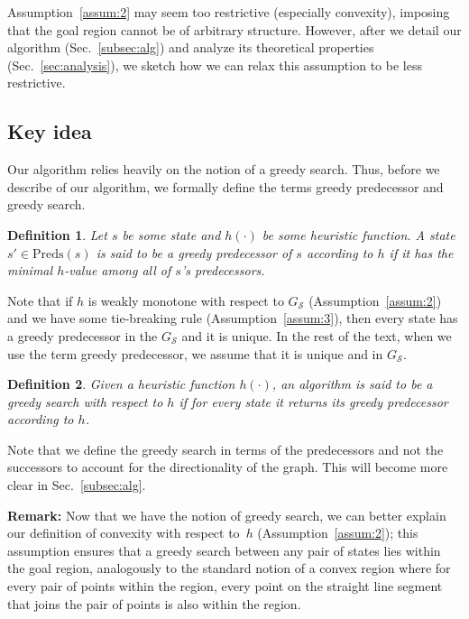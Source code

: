 \documentclass[letterpaper]{article} %
\newcommand{\calS}{\ensuremath{\mathcal{S}}\xspace}
\newtheorem{definition}{Definition}
\begin{document}
Assumption~\ref{assum:2} may seem too restrictive (especially convexity), imposing that the goal region cannot be of arbitrary structure. However, after we detail our algorithm (Sec.~\ref{subsec:alg}) and analyze its theoretical properties (Sec.~\ref{sec:analysis}), we sketch how we can relax this assumption to be less restrictive.


 
\subsection{Key idea}
\label{sec:key}
Our algorithm relies heavily on the notion of a greedy search.  Thus, before we describe of our algorithm, we formally define the terms greedy predecessor and greedy search.

\vspace{2mm}
\begin{definition}
\label{def:greedy-suc}
	Let $s$ be some state and $h(\cdot)$ be some heuristic function.
	A state $s' \in \text{Preds}(s)$ is said to be a \emph{greedy} predecessor of $s$ according to $h$ if it has the minimal $h$-value among all of $s$'s predecessors.
\end{definition}
Note that 
if $h$ is weakly monotone with respect to $G_\calS$
(Assumption~\ref{assum:2}) 
and we have some tie-breaking rule
(Assumption~\ref{assum:3}), then every state has a greedy predecessor in the $G_\calS$ and it is unique.
In the rest of the text, when we use the term greedy predecessor, we assume that it is unique and in $G_\calS$.

\vspace{2mm}
\begin{definition}
	Given a heuristic function $h(\cdot)$,
	an algorithm is said to be a \emph{greedy search}	 with respect to $h$ if for every state it returns its greedy predecessor according to $h$.
\end{definition}
Note that we define the greedy search in terms of the predecessors and not the successors to account for the directionality of the graph. This will become more clear in Sec.~\ref{subsec:alg}.

\textbf{Remark:} Now that we have the notion of greedy search, we can better explain our definition of convexity with respect to~$h$ (Assumption~\ref{assum:2});
this assumption ensures that a greedy search between any pair of states lies within the goal region, analogously to the standard notion of a convex region where for every pair of points within the region, every point on the straight line segment that joins the pair of points is also within the region.
\end{document}
